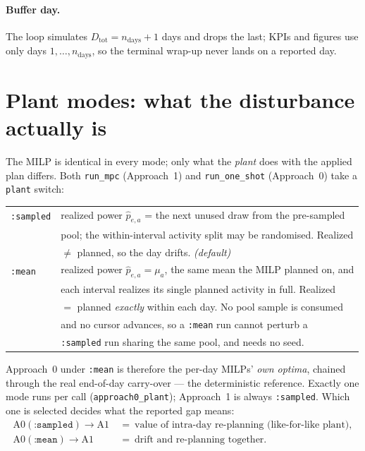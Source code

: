 \documentclass[11pt]{article}
\begin{document}
\paragraph{Buffer day.} The loop simulates $D_{\text{tot}}=n_{\text{days}}+1$ days and drops the
last; KPIs and figures use only days $1,\dots,n_{\text{days}}$, so the terminal wrap-up never lands
on a reported day.

\section{Plant modes: what the disturbance actually is}
\label{sec:plant}
The MILP is identical in every mode; only what the \emph{plant} does with the applied plan
differs. Both \texttt{run\_mpc} (Approach~1) and \texttt{run\_one\_shot} (Approach~0) take a
\texttt{plant} switch:

\medskip
\begin{tabular}{ll}
\texttt{:sampled} & realized power $\hat p_{e,a}$ = the next unused draw from the pre-sampled\\
                  & pool; the within-interval activity split may be randomised. Realized\\
                  & $\ne$ planned, so the day drifts. \emph{(default)}\\[4pt]
\texttt{:mean}    & realized power $\hat p_{e,a}=\mu_a$, the same mean the MILP planned on, and\\
                  & each interval realizes its single planned activity in full. Realized\\
                  & $=$ planned \emph{exactly} within each day. No pool sample is consumed\\
                  & and no cursor advances, so a \texttt{:mean} run cannot perturb a\\
                  & \texttt{:sampled} run sharing the same pool, and needs no seed.\\
\end{tabular}

\medskip
Approach~0 under \texttt{:mean} is therefore the per-day MILPs' \emph{own optima}, chained through
the real end-of-day carry-over --- the deterministic reference. Exactly one mode runs per call
(\texttt{approach0\_plant}); Approach~1 is always \texttt{:sampled}. Which one is selected decides
what the reported gap means:
\begin{align*}
\text{A0}(\texttt{:sampled})\to\text{A1}\ &=\ \text{value of intra-day re-planning (like-for-like plant)},\\
\text{A0}(\texttt{:mean})\to\text{A1}\ &=\ \text{drift and re-planning together}.
\end{align*}
\end{document}
